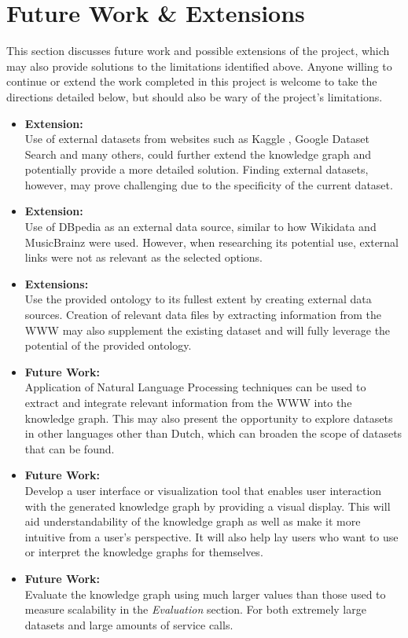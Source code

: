 \section{Future Work \& Extensions}
This section discusses future work and possible extensions of the project, which may also provide solutions to the limitations identified above. Anyone willing to continue or extend the work completed in this project is welcome to take the directions detailed below, but should also be wary of the project's limitations. 

\begin{itemize}
    \item \textbf{Extension:} \\ Use of external datasets from websites such as Kaggle \cite{kaggle}, Google Dataset Search \cite{googledatasetsearch} and many others, could further extend the knowledge graph and potentially provide a more detailed solution. Finding external datasets, however, may prove challenging due to the specificity of the current dataset. 
    \item \textbf{Extension:} \\ Use of DBpedia \cite{organdbpedia} as an external data source, similar to how Wikidata and MusicBrainz were used. However, when researching its potential use, external links were not as relevant as the selected options. 
    \item \textbf{Extensions:} \\ Use the provided ontology to its fullest extent by creating external data sources. Creation of relevant data files by extracting information from the WWW may also supplement the existing dataset and will fully leverage the potential of the provided ontology. 
    \item \textbf{Future Work:} \\ Application of Natural Language Processing techniques can be used to extract and integrate relevant information from the WWW into the knowledge graph. This may also present the opportunity to explore datasets in other languages other than Dutch, which can broaden the scope of datasets that can be found. 
    \item \textbf{Future Work:} \\ Develop a user interface or visualization tool that enables user interaction with the generated knowledge graph by providing a visual display. This will aid understandability of the knowledge graph as well as make it more intuitive from a user's perspective. It will also help lay users who want to use or interpret the knowledge graphs for themselves. 
    \item \textbf{Future Work:} \\ Evaluate the knowledge graph using much larger values than those used to measure scalability in the \textit{Evaluation} section. For both extremely large datasets and large amounts of service calls. 
\end{itemize}


